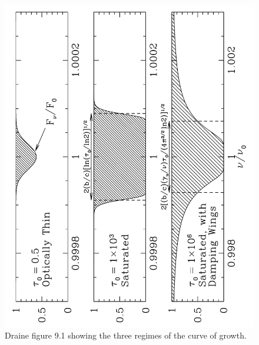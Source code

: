 \documentclass{tufte-handout}
\begin{document}
\begin{figure}
\includegraphics[width=0.8\columnwidth, angle=-90]{ism_figures/Draine-9_1}
\caption{Draine figure 9.1 showing the three regimes of the curve of growth.}
\label{fig:regimes of absorption line systems}
\end{figure}
\end{document}
